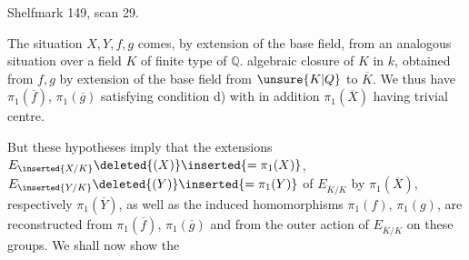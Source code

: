 Shelfmark 149, scan 29.


The situation $X,Y,f,g$ comes, by extension of the base field, from an analogous situation over a field $K$  of finite type of $\mathbb Q$.   algebraic closure  of $K$ in $k$,   obtained from  $f,g$ by extension of the base field from $\unsure{K|Q}$ to $\overline K$. We thus have $\pi_1(\overline f)$, $\pi_1(\overline g)$ satisfying condition d) with in addition $\pi_1(\overline X)$ having trivial centre.

But these hypotheses imply that the extensions $E_{\inserted{X/K}}\deleted{(X)}\inserted{=\pi_1(X)}$, $E_{\inserted{Y/K}}\deleted{(Y)}\inserted{=\pi_1(Y)}$ of $E_{\overline K/K}$ by $\pi_1(\overline X)$, respectively $\pi_1(\overline Y)$, as well as the induced homomorphisms $\pi_1(f)$, $\pi_1(g)$, are reconstructed from  $\pi_1(\overline f)$, $\pi_1(\overline g)$ and from the outer action of $E_{\overline K/K}$ on these groups. We shall now show the
